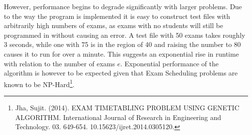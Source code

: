 \documentclass[11pt]{article}
\begin{document}
	However, performance begins to degrade significantly with larger problems. Due to the way the program is implemented it is easy to construct test files with arbitrarily high numbers of exams, as exams with no students will still be programmed in without causing an error. A test file with 50 exams takes roughly 3 seconds, while one with 75 is in the region of 40 and raising the number to 80 causes it to run for over a minute. This suggests an exponential rise in runtime with relation to the number of exams \(e\). Exponential performance of the algorithm is however to be expected given that Exam Scheduling problems are known to be NP-Hard\footnote{Jha, Sujit. (2014). EXAM TIMETABLING PROBLEM USING GENETIC ALGORITHM. International Journal of Research in Engineering and Technology. 03. 649-654. 10.15623/ijret.2014.0305120.}.
\end{document}
